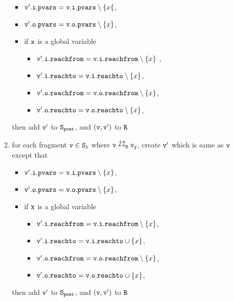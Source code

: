 \begin{itemize}
\begin{enumerate}
\begin{itemize}
\item $\mathtt{v}'.\mathtt{i}.\mathtt{pvars} = \mathtt{v}.\mathtt{i}.\mathtt{pvars} \setminus \{x\{$,
\item $\mathtt{v}'.\mathtt{o}.\mathtt{pvars} = \mathtt{v}.\mathtt{o}.\mathtt{pvars} \setminus \left\{x\right\}$,
\item if $\tt x$ is a global variable
\begin{itemize}
\item $\mathtt{v}'.\mathtt{i}.\mathtt{reachfrom} = \mathtt{v}.\mathtt{i}.\mathtt{reachfrom} \setminus \left\{x\right\}$ ,
\item $\mathtt{v}'.\mathtt{i}.\mathtt{reachto} = \mathtt{v}.\mathtt{i}.\mathtt{reachto} \setminus \left\{x\right\}$,
\item $\mathtt{v}'.\mathtt{o}.\mathtt{reachfrom} = \mathtt{v}.\mathtt{o}.\mathtt{reachfrom} \setminus \left\{x\right\}$,
\item $\mathtt{v}'.\mathtt{o}.\mathtt{reachto} = \mathtt{v}.\mathtt{o}.\mathtt{reachto} \setminus \left\{x\right\}$,
\end{itemize}
\end{itemize}
then add $\tt v'$ to $\tt S_{post}$, and $\tt (v,v')$ to $\tt R$
\item for each fragment $\tt v \in S_1$ where $\tt v \overset{+o}\leftrightarrow_S v_y$, create $\tt v'$ which is same as $\tt v$ except that 
\begin{itemize}
\item $\mathtt{v}'.\mathtt{i}.\mathtt{pvars} = \mathtt{v}.\mathtt{i}.\mathtt{pvars} \setminus \left\{x\right\}$,
\item $\mathtt{v}'.\mathtt{o}.\mathtt{pvars} = \mathtt{v}.\mathtt{o}.\mathtt{pvars} \setminus \left\{x\right\}$,
\item if $\tt x$ is a global variable
\begin{itemize}
\item $\mathtt{v}'.\mathtt{i}.\mathtt{reachfrom} = \mathtt{v}.\mathtt{i}.\mathtt{reachfrom} \setminus \left\{x\right\}$,
\item $\mathtt{v}'.\mathtt{i}.\mathtt{reachto} = \mathtt{v}.\mathtt{i}.\mathtt{reachto} \cup \left\{x\right\}$,
 \item $\mathtt{v}'.\mathtt{o}.\mathtt{reachfrom} = \mathtt{v}.\mathtt{o}.\mathtt{reachfrom} \setminus \left\{x\right\}$,
 \item $\mathtt{v}'.\mathtt{o}.\mathtt{reachto} = \mathtt{v}.\mathtt{o}.\mathtt{reachto} \cup \left\{x\right\}$,
\end{itemize}
\end{itemize}
then add $\tt v'$ to $\tt S_{post}$, and $\tt (v,v')$ to $\tt R$


\end{enumerate}
\end{itemize}
